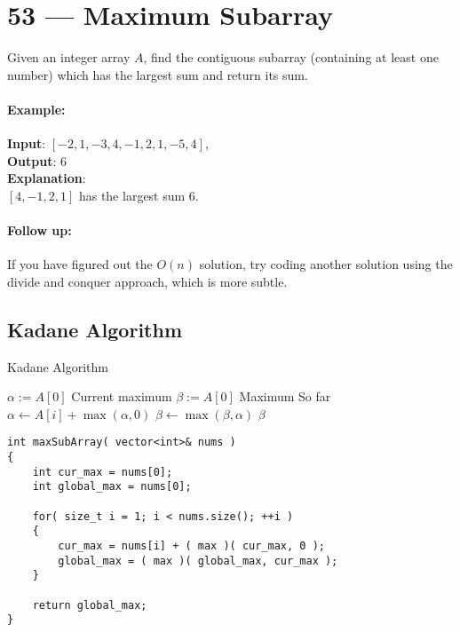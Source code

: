 \section{53 --- Maximum Subarray}
Given an integer array $A$, find the contiguous subarray (containing at least one number) which has the largest sum and return its sum.
\paragraph{Example:}
\begin{flushleft}
\textbf{Input}: $[-2,1,-3,4,-1,2,1,-5,4]$,
\\
\textbf{Output}: 6
\\
\textbf{Explanation}: 
\\
$[4,-1,2,1]$ has the largest sum 6.
\end{flushleft}

\paragraph{Follow up:}
\begin{flushleft}
If you have figured out the $O(n)$ solution, try coding another solution using the divide and conquer approach, which is more subtle.
\end{flushleft}

\subsection{Kadane Algorithm}
\setcounter{algorithm}{0}
\begin{algorithm}[H]
\caption{Kadane Algorithm}
\begin{algorithmic}[1]
\State $\alpha := A[0]$ \Comment Current maximum
\State $\beta:=A[0]$ \Comment Maximum So far
\State $\alpha \gets A[i] + \max(\alpha, 0)$
\State $\beta \gets \max(\beta, \alpha)$
\EndFor
\State \Return $\beta$
\EndProcedure
\end{algorithmic}
\end{algorithm}

\setcounter{lstlisting}{0}
\begin{lstlisting}[style=customc, caption={Kadane Algorithm}]
int maxSubArray( vector<int>& nums )
{
    int cur_max = nums[0];
    int global_max = nums[0];

    for( size_t i = 1; i < nums.size(); ++i )
    {
        cur_max = nums[i] + ( max )( cur_max, 0 );
        global_max = ( max )( global_max, cur_max );
    }

    return global_max;
}
\end{lstlisting}

